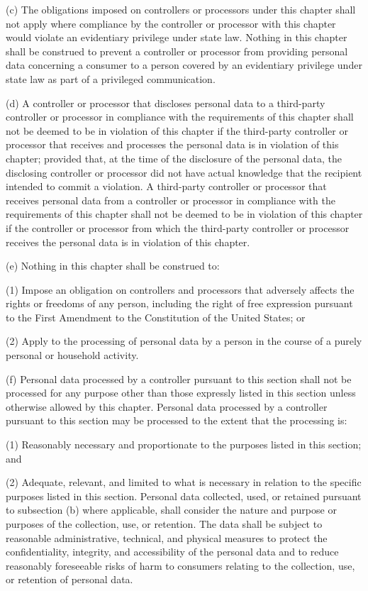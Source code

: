      (c)  The obligations imposed on controllers or processors under this chapter shall not apply where compliance by the controller or processor with this chapter would violate an evidentiary privilege under state law.  Nothing in this chapter shall be construed to prevent a controller or processor from providing personal data concerning a consumer to a person covered by an evidentiary privilege under state law as part of a privileged communication.

     (d)  A controller or processor that discloses personal data to a third-party controller or processor in compliance with the requirements of this chapter shall not be deemed to be in violation of this chapter if the third-party controller or processor that receives and processes the personal data is in violation of this chapter; provided that, at the time of the disclosure of the personal data, the disclosing controller or processor did not have actual knowledge that the recipient intended to commit a violation.  A third-party controller or processor that receives personal data from a controller or processor in compliance with the requirements of this chapter shall not be deemed to be in violation of this chapter if the controller or processor from which the third-party controller or processor receives the personal data is in violation of this chapter.

     (e)  Nothing in this chapter shall be construed to:

     (1)  Impose an obligation on controllers and processors that adversely affects the rights or freedoms of any person, including the right of free expression pursuant to the First Amendment to the Constitution of the United States; or

     (2)  Apply to the processing of personal data by a person in the course of a purely personal or household activity.

     (f)  Personal data processed by a controller pursuant to this section shall not be processed for any purpose other than those expressly listed in this section unless otherwise allowed by this chapter.  Personal data processed by a controller pursuant to this section may be processed to the extent that the processing is:

     (1)  Reasonably necessary and proportionate to the purposes listed in this section; and

     (2)  Adequate, relevant, and limited to what is necessary in relation to the specific purposes listed in this section. Personal data collected, used, or retained pursuant to subsection (b) where applicable, shall consider the nature and purpose or purposes of the collection, use, or retention.  The data shall be subject to reasonable administrative, technical, and physical measures to protect the confidentiality, integrity, and accessibility of the personal data and to reduce reasonably foreseeable risks of harm to consumers relating to the collection, use, or retention of personal data.

